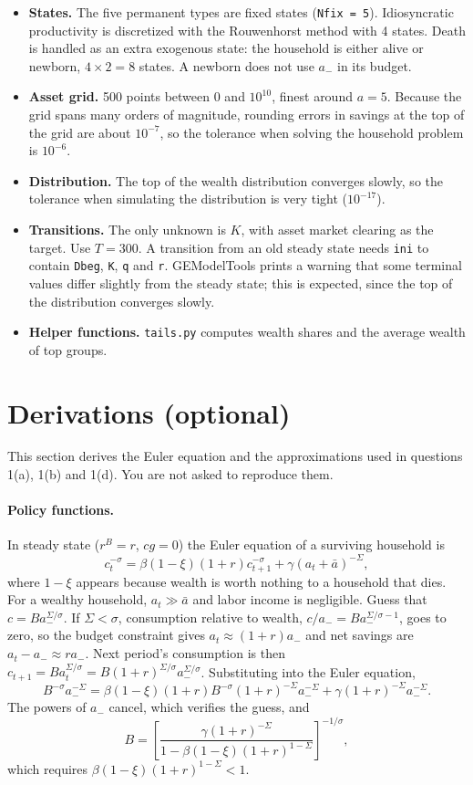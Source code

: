 \documentclass[12pt]{article}
\begin{document}
\begin{itemize}
\item \textbf{States.} The five permanent types are fixed states (\texttt{Nfix = 5}). Idiosyncratic productivity is discretized with the Rouwenhorst method with 4 states.
Death is handled as an extra exogenous state: the household is either alive or newborn, $4\times2=8$ states. A newborn does not use $a_{-}$ in its budget.
\item \textbf{Asset grid.} 500 points between 0 and $10^{10}$, finest around $a=5$. Because the grid spans many orders of magnitude, rounding errors in savings at the top of the grid are about $10^{-7}$, so the tolerance when solving the household problem is $10^{-6}$.
\item \textbf{Distribution.} The top of the wealth distribution converges slowly, so the tolerance when simulating the distribution is very tight ($10^{-17}$).
\item \textbf{Transitions.} The only unknown is $K$, with asset market clearing as the target. Use $T=300$. A transition from an old steady state needs \texttt{ini} to contain \texttt{Dbeg}, \texttt{K}, \texttt{q} and \texttt{r}. GEModelTools prints a warning that some terminal values differ slightly from the steady state; this is expected, since the top of the distribution converges slowly.
\item \textbf{Helper functions.} \texttt{tails.py} computes wealth shares and the average wealth of top groups.
\end{itemize}

\section{Derivations (optional)}

This section derives the Euler equation and the approximations used in questions 1(a), 1(b) and 1(d). You are not asked to reproduce them.

\paragraph*{Policy functions.} In steady state ($r^B=r$, $cg=0$) the Euler equation of a surviving household is
$$c_t^{-\sigma}=\beta(1-\xi)(1+r)c_{t+1}^{-\sigma}+\gamma(a_t+\bar a)^{-\Sigma},$$
where $1-\xi$ appears because wealth is worth nothing to a household that dies. For a wealthy household, $a_t\gg\bar a$ and labor income is negligible. Guess that $c=Ba_{-}^{\Sigma/\sigma}$. If $\Sigma<\sigma$, consumption relative to wealth, $c/a_{-}=Ba_{-}^{\Sigma/\sigma-1}$, goes to zero, so the budget constraint gives $a_t\approx(1+r)a_{-}$ and net savings are $a_t-a_{-}\approx ra_{-}$. Next period's consumption is then $c_{t+1}=Ba_t^{\Sigma/\sigma}=B(1+r)^{\Sigma/\sigma}a_{-}^{\Sigma/\sigma}$. Substituting into the Euler equation,
$$B^{-\sigma}a_{-}^{-\Sigma}=\beta(1-\xi)(1+r)B^{-\sigma}(1+r)^{-\Sigma}a_{-}^{-\Sigma}+\gamma(1+r)^{-\Sigma}a_{-}^{-\Sigma}.$$
The powers of $a_{-}$ cancel, which verifies the guess, and
$$B=\left[\frac{\gamma(1+r)^{-\Sigma}}{1-\beta(1-\xi)(1+r)^{1-\Sigma}}\right]^{-1/\sigma},$$
which requires $\beta(1-\xi)(1+r)^{1-\Sigma}<1$.
\end{document}
